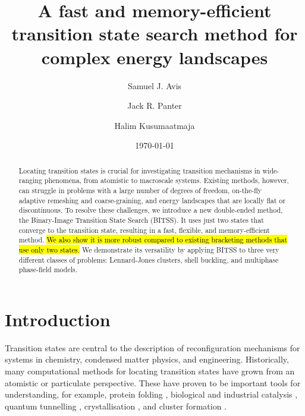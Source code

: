 \documentclass[aip,jcp,reprint,twocolumn]{revtex4-1}
\begin{document}
\title{A fast and memory-efficient transition state search method for complex energy landscapes}
\date{\today}

\author{Samuel J. Avis}
\author{Jack R. Panter}
\author{Halim Kusumaatmaja}

\begin{abstract}
  Locating transition states is crucial for investigating transition mechanisms in wide-ranging phenomena, from atomistic to macroscale systems.
  Existing methods, however, can struggle in problems with a large number of degrees of freedom, on-the-fly adaptive remeshing and coarse-graining, and energy landscapes that are locally flat or discontinuous.
  To resolve these challenges, we introduce a new double-ended method, the Binary-Image Transition State Search (BITSS).
  It uses just two states that converge to the transition state, resulting in a fast, flexible, and memory-efficient method.
  \hl{We also show it is more robust compared to existing bracketing methods that use only two states.}
  We demonstrate its versatility by applying BITSS to three very different classes of problems: Lennard-Jones clusters, shell buckling, and multiphase phase-field models.
\end{abstract}

\maketitle


\section{Introduction}
Transition states are central to the description of reconfiguration mechanisms for systems in chemistry, condensed matter physics, and engineering.
Historically, many computational methods for locating transition states have grown from an atomistic or particulate perspective.
These have proven to be important tools for understanding, for example, protein folding \cite{Bryngelson1995,Onuchic1997}, biological and industrial catalysis \cite{Boehr2006,Kerns2015,Guo2018a}, quantum tunnelling \cite{Richardson2016,Vaillant2019}, crystallisation \cite{Richard2018}, and cluster formation \cite{Wales1998,Wales2012}.
\end{document}
